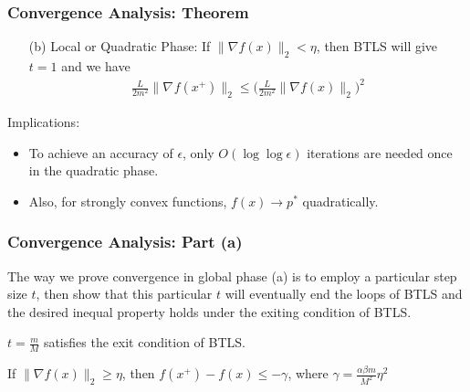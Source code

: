\documentclass{beamer}
\begin{document}
\begin{frame}
    \frametitle{Convergence Analysis: Theorem}    
    \begin{theorem}[Part II]
        \begin{itemize}
            \item[(b)] Local or Quadratic Phase: If $\|\nabla f(x)\|_2 < \eta$,
                then BTLS will give $t = 1$ and we have
                \begin{align}
                    \frac{L}{2m^2} \|\nabla_{}f(x^{+})\|_2 \leq 
                    \bigg(\frac{L}{2m^2} \|\nabla f(x)\|_2 \bigg)^2
                \end{align}
        \end{itemize}
    \end{theorem}
    Implications:
    \begin{itemize}
    \item To achieve an accuracy of $\epsilon$, only $O(\log \log \epsilon)$ iterations are needed once in the quadratic phase.
    \item Also, for strongly convex functions, $f(x) \to p^{*}$ quadratically.
    \end{itemize}
\end{frame}

\begin{frame}
    \frametitle{Convergence Analysis: Part (a)}    
    The way we prove convergence in global phase (a) is to employ a particular
    step size $t$, then show that this particular $t$ will eventually end the
    loops of BTLS and the desired inequal property holds under the exiting
    condition of BTLS. 
    
    \begin{lemma}
        $t = \frac{m}{M}$ satisfies the exit condition of BTLS.
    \end{lemma}
    \begin{lemma}
        If $\|\nabla f(x)\|_2 \geq \eta$, 
        then $f(x^{+}) - f(x) \leq -\gamma$, 
        where  $\gamma = \frac{\alpha \beta m}{M^2}\eta^2$
    \end{lemma}
\end{frame}
\end{document}
